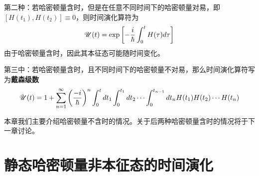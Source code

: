 第二种：若哈密顿量含时，但是在任意不同时间下的哈密顿量对易，即$ [H(t_1),H(t_2)]\equiv0 $，则时间演化算符为
\begin{equation}\label{key}
\mathscr{U}(t)=\exp\left[-\dfrac{i}{\hbar}\int_0^t H(\tau)d\tau\right]
\end{equation}
由于哈密顿量含时，因此其本征态可能随时间变化。

第三中：若哈密顿量含时，且不同时间下的哈密顿量不对易，那么时间演化算符写为\textbf{戴森级数}
\begin{equation}\label{key}
\mathscr{U}(t)=1+\sum_{n=1}^\infty\left(\dfrac{-i}{\hbar}\right)^n\int_0^tdt_1\int_0^{t_1}dt_2\cdots\int_0^{t_{n-1}}dt_n H(t_1)H(t_2)\cdots H(t_n)
\end{equation}

本章我们主要介绍哈密顿量不含时的情况。关于后两种哈密顿量含时的情况将于下一章讨论。

\section{静态哈密顿量非本征态的时间演化}